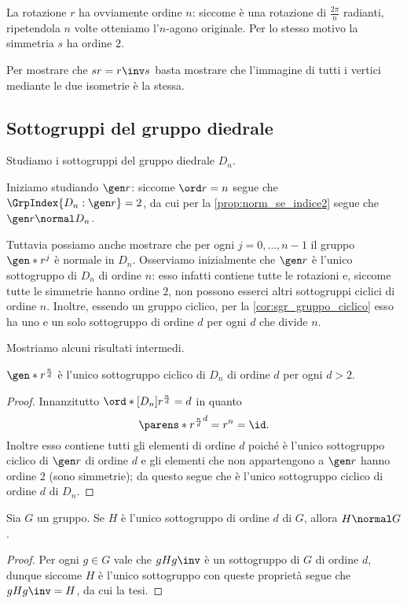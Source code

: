 La rotazione $r$ ha ovviamente ordine $n$: siccome è una rotazione di $\frac{2\pi}{n}$ radianti, ripetendola $n$ volte otteniamo l'$n$-agono originale.
Per lo stesso motivo la simmetria $s$ ha ordine $2$.

Per mostrare che $sr = r\inv s$ basta mostrare che l'immagine di tutti i vertici mediante le due isometrie è la stessa. 

\subsection{Sottogruppi del gruppo diedrale}

Studiamo i sottogruppi del gruppo diedrale $D_n$.

Iniziamo studiando $\gen r$: siccome $\ord r = n$ segue che $\GrpIndex{D_n : \gen r} = 2$, da cui per la \autoref{prop:norm_se_indice2} segue che $\gen r \normal D_n$.

Tuttavia possiamo anche mostrare che per ogni $j = 0, \dots, n-1$ il gruppo $\gen*{r^j}$ è normale in $D_n$. Osserviamo inizialmente che $\gen r$ è l'unico sottogruppo di $D_n$ di ordine $n$: esso infatti contiene tutte le rotazioni e, siccome tutte le simmetrie hanno ordine $2$, non possono esserci altri sottogruppi ciclici di ordine $n$.
Inoltre, essendo un gruppo ciclico, per la \autoref{cor:sgr_gruppo_ciclico} esso ha uno e un solo sottogruppo di ordine $d$ per ogni $d$ che divide $n$.

Mostriamo alcuni risultati intermedi.
\begin{proposition}
    $\gen*{r^{\frac{n}{d}}}$ è l'unico sottogruppo ciclico di $D_n$ di ordine $d$ per ogni $d > 2$.
\end{proposition}
\begin{proof}
    Innanzitutto $\ord*[D_n]{r^{\frac{n}{d}}} = d$ in quanto \[
        \parens*{r^{\frac{n}{d}}}^d = r^n = \id.
    \] Inoltre esso contiene tutti gli elementi di ordine $d$ poiché è l'unico sottogruppo ciclico di $\gen r$ di ordine $d$ e gli elementi che non appartengono a $\gen r$ hanno ordine $2$ (sono simmetrie); da questo segue che è l'unico sottogruppo ciclico di ordine $d$ di $D_n$.
\end{proof}

\begin{proposition}
    Sia $G$ un gruppo. Se $H$ è l'unico sottogruppo di ordine $d$ di $G$, allora $H \normal G$.
\end{proposition}
\begin{proof}
    Per ogni $g \in G$ vale che $gHg\inv$ è un sottogruppo di $G$ di ordine $d$, dunque siccome $H$ è l'unico sottogruppo con queste proprietà segue che $gHg\inv = H$, da cui la tesi.
\end{proof}

